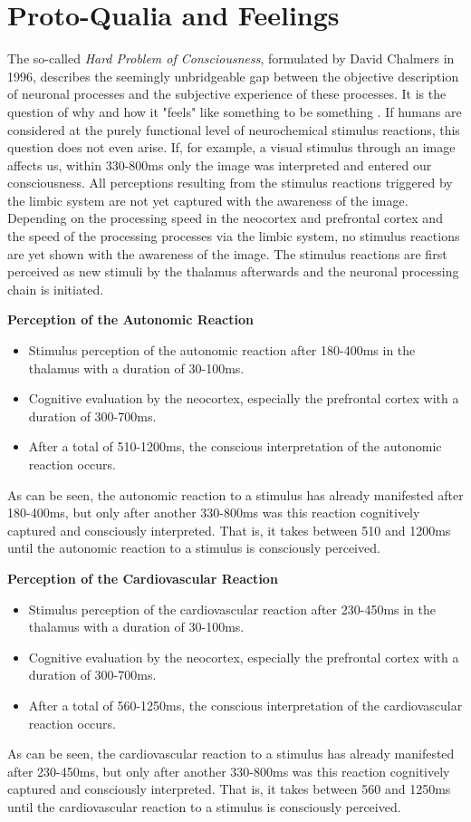 \section*{Proto-Qualia and Feelings}
The so-called \emph{Hard Problem of Consciousness}, formulated by David Chalmers in 1996, describes the seemingly unbridgeable gap between the objective description of neuronal processes and the subjective experience of these processes. It is the question of why and how it "feels" like something to be something \cite{Chalmers1996}. If humans are considered at the purely functional level of neurochemical stimulus reactions, this question does not even arise. If, for example, a visual stimulus through an image affects us, within 330-800ms only the image was interpreted and entered our consciousness. All perceptions resulting from the stimulus reactions triggered by the limbic system are not yet captured with the awareness of the image. Depending on the processing speed in the neocortex and prefrontal cortex and the speed of the processing processes via the limbic system, no stimulus reactions are yet shown with the awareness of the image. The stimulus reactions are first perceived as new stimuli by the thalamus afterwards and the neuronal processing chain is initiated.

\textbf{Perception of the Autonomic Reaction}

\begin{itemize}
  \item Stimulus perception of the autonomic reaction after 180-400ms in the thalamus with a duration of 30-100ms.
  \item Cognitive evaluation by the neocortex, especially the prefrontal cortex with a duration of 300-700ms.
  \item After a total of 510-1200ms, the conscious interpretation of the autonomic reaction occurs.
\end{itemize}
As can be seen, the autonomic reaction to a stimulus has already manifested after 180-400ms, but only after another 330-800ms was this reaction cognitively captured and consciously interpreted. That is, it takes between 510 and 1200ms until the autonomic reaction to a stimulus is consciously perceived.

\textbf{Perception of the Cardiovascular Reaction}

\begin{itemize}
  \item Stimulus perception of the cardiovascular reaction after 230-450ms in the thalamus with a duration of 30-100ms.
  \item Cognitive evaluation by the neocortex, especially the prefrontal cortex with a duration of 300-700ms.
  \item After a total of 560-1250ms, the conscious interpretation of the cardiovascular reaction occurs.
\end{itemize}
As can be seen, the cardiovascular reaction to a stimulus has already manifested after 230-450ms, but only after another 330-800ms was this reaction cognitively captured and consciously interpreted. That is, it takes between 560 and 1250ms until the cardiovascular reaction to a stimulus is consciously perceived.

